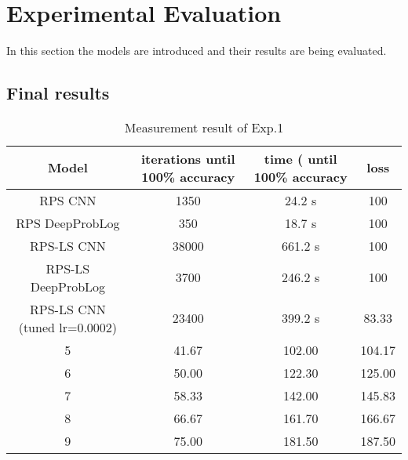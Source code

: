 \section{Experimental Evaluation}
In this section the models are introduced and their results are being evaluated.






\subsection{Final results}


\begin{table}[!h]
    \centering
    \begin{tabular}{|c|c|c|c|}
        \hline
        Model & iterations until 100\% accuracy  & time ( until 100\% accuracy   & loss \\
        \hline\hline
        RPS CNN & 1350 & 24.2 s& 100 \\
        \hline
        RPS DeepProbLog & 350 & 18.7 s &100\\
        \hline
        \hline
        RPS-LS CNN & 38000 & 661.2 s&100\\
        \hline
        RPS-LS DeepProbLog & 3700 & 246.2 s&100\\
        \hline
        RPS-LS CNN (tuned lr=0.0002)& 23400 & 399.2 s&83.33\\
        \hline
        5 & 41.67 & 102.00 &104.17\\
        \hline
        6 & 50.00 & 122.30 &125.00\\
        \hline
        7 & 58.33 & 142.00 &145.83\\
        \hline
        8 & 66.67 & 161.70 &166.67\\
        \hline
        9 & 75.00 & 181.50 &187.50\\
        \hline
    \end{tabular}
    \caption{Measurement result of Exp.1}
    \label{t1}
    \end{table}